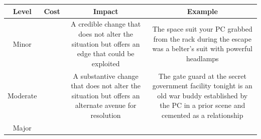 \documentclass[
]{article}
\begin{document}
\begin{longtable}[]{@{}cccc@{}}
\toprule
\begin{minipage}[b]{0.28\columnwidth}\centering
Level\strut
\end{minipage} & \begin{minipage}[b]{0.06\columnwidth}\centering
Cost\strut
\end{minipage} & \begin{minipage}[b]{0.28\columnwidth}\centering
Impact\strut
\end{minipage} & \begin{minipage}[b]{0.28\columnwidth}\centering
Example\strut
\end{minipage}\tabularnewline
\midrule
\endhead
\begin{minipage}[t]{0.28\columnwidth}\centering
Minor\strut
\end{minipage} & \begin{minipage}[t]{0.06\columnwidth}\centering
1\strut
\end{minipage} & \begin{minipage}[t]{0.28\columnwidth}\centering
A credible change that does not alter the situation but offers an edge
that could be exploited\strut
\end{minipage} & \begin{minipage}[t]{0.28\columnwidth}\centering
The space suit your PC grabbed from the rack during the escape was a
belter's suit with powerful headlamps\strut
\end{minipage}\tabularnewline
\begin{minipage}[t]{0.28\columnwidth}\centering
Moderate\strut
\end{minipage} & \begin{minipage}[t]{0.06\columnwidth}\centering
2\strut
\end{minipage} & \begin{minipage}[t]{0.28\columnwidth}\centering
A substantive change that does not alter the situation but offers an
alternate avenue for resolution\strut
\end{minipage} & \begin{minipage}[t]{0.28\columnwidth}\centering
The gate guard at the secret government facility tonight is an old war
buddy established by the PC in a prior scene and cemented as a
relationship\strut
\end{minipage}\tabularnewline
\begin{minipage}[t]{0.28\columnwidth}\centering
Major\strut
\end{minipage} & \begin{minipage}[t]{0.06\columnwidth}\centering

\end{minipage}
\end{longtable}
\end{document}
